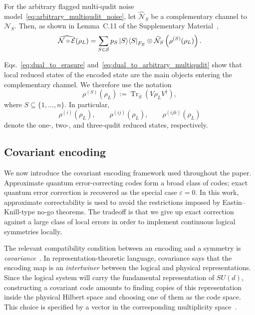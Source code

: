 \documentclass[10pt,twocolumn,superscriptaddress,aps,amsmath,amssymb,citeautoscript,floatfix,prx,longbibliography]{revtex4-2}
\theoremstyle{plain}
\theoremstyle{plain}
\theoremstyle{plain}
\theoremstyle{plain}
\theoremstyle{plain}
\theoremstyle{plain}
\begin{document}
For the arbitrary flagged multi-qudit noise model~\eqref{eq:arbitrary_multiqudit_noise}, let $\widehat{\mathcal N}_S$ be a complementary channel to $\mathcal N_S$. Then, as shown in Lemma~C.11 of the Supplementary Material~\cite{SuppMat},
\begin{equation}\label{eq:dual_to_arbitrary_multiqudit}
    \widehat{\mathcal N\circ\mathcal E}(\rho_L)
    =
    \sum_{S\in\mathcal S}
    p_S
    \ket S\!\bra S_{F_E}
    \otimes
    \widehat{\mathcal N}_S
    \left(
        \rho^{(S)}(\rho_L)
    \right).
\end{equation}

Eqs.~\eqref{eq:dual_to_erasure} and~\eqref{eq:dual_to_arbitrary_multiqudit} show that local reduced states of the encoded state are the main objects entering the complementary channel. We therefore use the notation
\begin{equation}\label{eq:reduced_state}
    \rho^{(S)}(\rho_L)
    :=
    \operatorname{Tr}_{\bar S}
    \left(
        V\rho_LV^\dagger
    \right),
\end{equation}
where $S\subseteq\{1,\ldots,n\}$. In particular,
$$
    \rho^{(i)}(\rho_L),
    \qquad
    \rho^{(ij)}(\rho_L),
    \qquad
    \rho^{(ijk)}(\rho_L)
$$
denote the one-, two-, and three-qudit reduced states, respectively.

\subsection{Covariant encoding}\label{subsec:main_covar_enc}

We now introduce the covariant encoding framework used throughout the paper. Approximate quantum error-correcting codes form a broad class of codes; exact quantum error correction is recovered as the special case $\varepsilon=0$. In this work, approximate correctability is used to avoid the restrictions imposed by Eastin--Knill-type no-go theorems. The tradeoff is that we give up exact correction against a large class of local errors in order to implement continuous logical symmetries locally.

The relevant compatibility condition between an encoding and a symmetry is \textit{covariance}~\cite{Hayden2021}. In representation-theoretic language, covariance says that the encoding map is an \textit{intertwiner} between the logical and physical representations. Since the logical system will carry the fundamental representation of $SU(d)$, constructing a covariant code amounts to finding copies of this representation inside the physical Hilbert space and choosing one of them as the code space. This choice is specified by a vector in the corresponding multiplicity space~\cite{Denys2024}.
\end{document}

